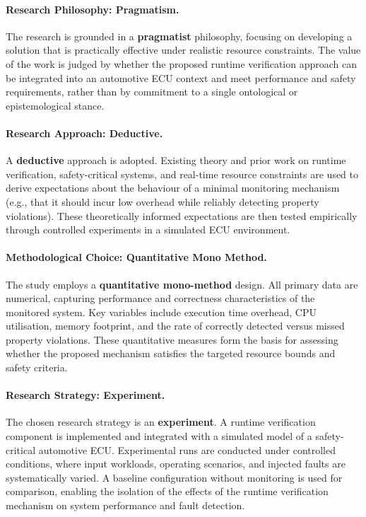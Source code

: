 \paragraph{Research Philosophy: Pragmatism.}
The research is grounded in a \textbf{pragmatist} philosophy, focusing on developing a solution that is practically effective under realistic resource constraints. The value of the work is judged by whether the proposed runtime verification approach can be integrated into an automotive ECU context and meet performance and safety requirements, rather than by commitment to a single ontological or epistemological stance.

\paragraph{Research Approach: Deductive.}
A \textbf{deductive} approach is adopted. Existing theory and prior work on runtime verification, safety-critical systems, and real-time resource constraints are used to derive expectations about the behaviour of a minimal monitoring mechanism (e.g., that it should incur low overhead while reliably detecting property violations). These theoretically informed expectations are then tested empirically through controlled experiments in a simulated ECU environment.

\paragraph{Methodological Choice: Quantitative Mono Method.}
The study employs a \textbf{quantitative mono-method} design. All primary data are numerical, capturing performance and correctness characteristics of the monitored system. Key variables include execution time overhead, CPU utilisation, memory footprint, and the rate of correctly detected versus missed property violations. These quantitative measures form the basis for assessing whether the proposed mechanism satisfies the targeted resource bounds and safety criteria.

\paragraph{Research Strategy: Experiment.}
The chosen research strategy is an \textbf{experiment}. A runtime verification component is implemented and integrated with a simulated model of a safety-critical automotive ECU. Experimental runs are conducted under controlled conditions, where input workloads, operating scenarios, and injected faults are systematically varied. A baseline configuration without monitoring is used for comparison, enabling the isolation of the effects of the runtime verification mechanism on system performance and fault detection.

